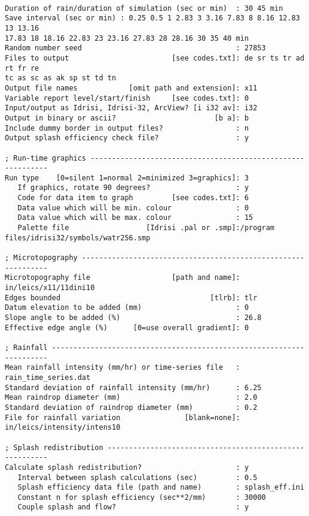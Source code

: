 \begin{verbatim}

Duration of rain/duration of simulation (sec or min)  : 30 45 min
Save interval (sec or min) : 0.25 0.5 1 2.83 3 3.16 7.83 8 8.16 12.83 13 13.16
17.83 18 18.16 22.83 23 23.16 27.83 28 28.16 30 35 40 min
Random number seed                                    : 27853
Files to output                        [see codes.txt]: de sr ts tr ad rt fr re
tc as sc as ak sp st td tn
Output file names            [omit path and extension]: x11
Variable report level/start/finish     [see codes.txt]: 0
Input/output as Idrisi, Idrisi-32, ArcView? [i i32 av]: i32
Output in binary or ascii?                       [b a]: b
Include dummy border in output files?                 : n
Output splash efficiency check file?                  : y

; Run-time graphics ------------------------------------------------------------
Run type    [0=silent 1=normal 2=minimized 3=graphics]: 3
   If graphics, rotate 90 degrees?                    : y
   Code for data item to graph         [see codes.txt]: 6
   Data value which will be min. colour               : 0
   Data value which will be max. colour               : 15
   Palette file                  [Idrisi .pal or .smp]:/program
files/idrisi32/symbols/watr256.smp

; Microtopography --------------------------------------------------------------
Microtopography file                   [path and name]: in/leics/x11/11dini10
Edges bounded                                   [tlrb]: tlr
Datum elevation to be added (mm)                      : 0
Slope angle to be added (%)                           : 26.8
Effective edge angle (%)      [0=use overall gradient]: 0

; Rainfall ---------------------------------------------------------------------
Mean rainfall intensity (mm/hr) or time-series file   : rain_time_series.dat
Standard deviation of rainfall intensity (mm/hr)      : 6.25
Mean raindrop diameter (mm)                           : 2.0
Standard deviation of raindrop diameter (mm)          : 0.2
File for rainfall variation               [blank=none]:
in/leics/intensity/intens10

; Splash redistribution --------------------------------------------------------
Calculate splash redistribution?                      : y
   Interval between splash calculations (sec)         : 0.5
   Splash efficiency data file (path and name)        : splash_eff.ini
   Constant n for splash efficiency (sec**2/mm)       : 30000
   Couple splash and flow?                            : y


\end{verbatim}

